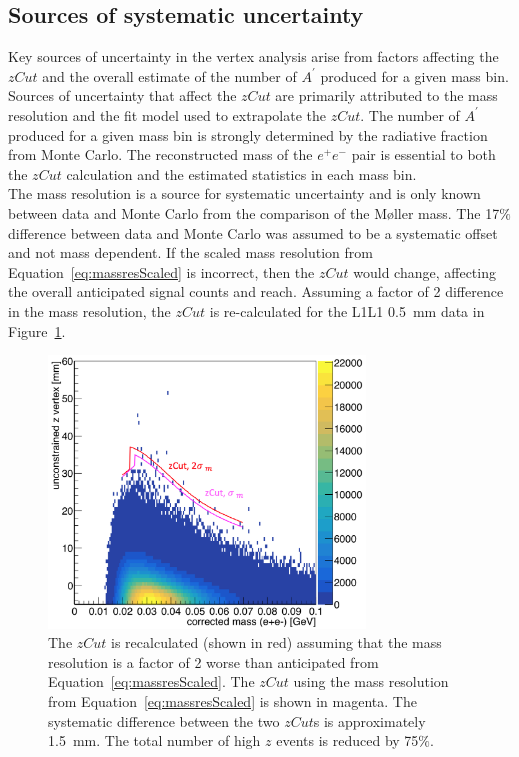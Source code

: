 \subsection{Sources of systematic uncertainty}
Key sources of uncertainty in the vertex analysis arise from factors affecting the $zCut$ and the overall estimate of the number of $A^{\prime}$ produced for a given mass bin. Sources of uncertainty that affect the $zCut$ are primarily attributed to the mass resolution and the fit model used to extrapolate the $zCut$. The number of $A^{\prime}$ produced for a given mass bin is strongly determined by the radiative fraction from Monte Carlo. The reconstructed mass of the $e^+e^-$ pair is essential to both the $zCut$ calculation and the estimated statistics in each mass bin.\\
\indent The mass resolution is  a source for systematic uncertainty and is only known between data and Monte Carlo from the comparison of the M\o ller mass. The 17$\%$ difference between data and Monte Carlo was assumed to be a systematic offset and not mass dependent. If the scaled mass resolution from Equation~\eqref{eq:massresScaled} is incorrect, then the $zCut$ would change, affecting the overall anticipated signal counts and reach. Assuming a factor of 2 difference in the mass resolution, the $zCut$ is re-calculated for the L1L1 0.5~mm data in Figure~\ref{fig:mResdub}. 
\begin{figure}[htb]
  \centering
      \includegraphics[width=0.75\textwidth]{pics/results/mres_systematics.png}
  \caption[$zCut$ when mass resolution is doubled]{The $zCut$ is recalculated (shown in red) assuming that the mass resolution is a factor of 2 worse than anticipated from Equation~\eqref{eq:massresScaled}. The $zCut$ using the mass resolution from Equation~\eqref{eq:massresScaled} is shown in magenta. The systematic difference between the two $zCut$s is approximately 1.5~mm. The total number of high $z$ events is reduced by 75$\%$.}
   \label{fig:mResdub}
\end{figure}
